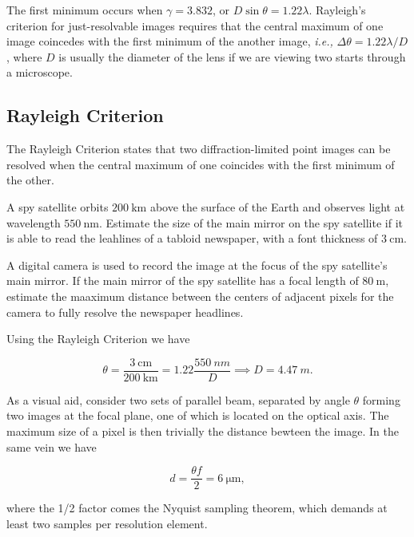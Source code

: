 \documentclass[english,a4paper,12pt]{report}
\begin{document}

The first minimum occurs when \(\gamma = 3.832\), or \(D \sin \theta = 1.22 \lambda\). Rayleigh's criterion for just-resolvable images requires that the central maximum of one image coincedes with the first minimum of the another image, \textit{i.e.,} \(\Delta \theta = 1.22 \lambda /D\), where \(D\) is usually the diameter of the lens if we are viewing two starts through a microscope.   

\subsection{Rayleigh Criterion}

The Rayleigh Criterion states that two diffraction-limited point images can be resolved when the central maximum of one coincides with the first minimum of the other.

{A spy satellite orbits \(\SI{200}{\km} \) above the surface of the Earth and observes light at wavelength \(\SI{550}{\nm} \). Estimate the size of the main mirror on the spy satellite if it is able to read the leahlines of a tabloid newspaper, with a font thickness of \(\SI{3}{\cm} \). 

A digital camera is used to record the image at the focus of the spy satellite's main mirror. If the main mirror of the spy satellite has a focal length of \(\SI{80}{\m} \), estimate the maaximum distance between the centers of adjacent pixels for the camera to fully resolve the newspaper headlines.}
{Using the Rayleigh Criterion we have

\begin{equation}
    \theta = \frac{\SI{3}{\cm} }{\SI{200}{\km} } = 1.22 \frac{\SI{550}{nm} }{D} \implies D = \SI{4.47}{m}.
\end{equation}

As a visual aid, consider two sets of parallel beam, separated by angle \(\theta \) forming two images at the focal plane, one of which is located on the optical axis. The maximum size of a pixel is then trivially the distance bewteen the image. In the same vein we have 

\begin{equation}
    d = \frac{\theta f}{2} = \SI{6}{\um},  
\end{equation}

where the 1/2 factor comes the Nyquist sampling theorem, which demands at least two samples per resolution element.
} 
\end{document}
